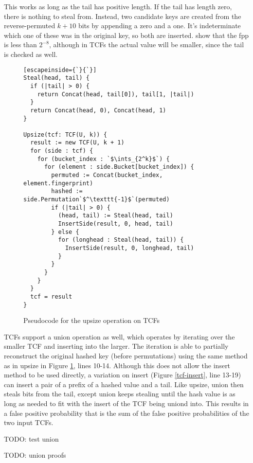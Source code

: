 \documentclass[manuscript,screen,review]{acmart}
\newcommand{\ints}{\mathbb{Z}}
\begin{document}
This works as long as the tail has positive length.
If the tail has length zero, there is nothing to steal from.
Instead, two candidate keys are created from the reverse-permuted $k+10$ bits by appending a zero and a one.
It's indeterminate which one of these was in the original key, so both are inserted.
\cite{psw} show that the fpp is less than $2^{-8}$, although in TCFs the actual value will be smaller, since the tail is checked as well.

\begin{figure}

\begin{lstlisting}[escapeinside={`}{`}]
Steal(head, tail) {
  if (|tail| > 0) {
    return Concat(head, tail[0]), tail[1, |tail|)
  }
  return Concat(head, 0), Concat(head, 1)
}

Upsize(tcf: TCF(U, k)) {
  result := new TCF(U, k + 1)
  for (side : tcf) {
    for (bucket_index : `$\ints_{2^k}$`) {
      for (element : side.Bucket[bucket_index]) {
        permuted := Concat(bucket_index, element.fingerprint)
        hashed := side.Permutation`$^\texttt{-1}$`(permuted)
        if (|tail| > 0) {
          (head, tail) := Steal(head, tail)
          InsertSide(result, 0, head, tail)
        } else {
          for (longhead : Steal(head, tail)) {
            InsertSide(result, 0, longhead, tail)
          }
        }
      }
    }
  }
  tcf = result
}
\end{lstlisting}
\caption{\label{tcf-upsize}
Pseudocode for the upsize operation on TCFs}

\end{figure}

TCFs support a union operation as well, which operates by iterating over the smaller TCF and inserting into the larger.
The iteration is able to partially reconstruct the original hashed key (before permutations) using the same method as in upsize in Figure \ref{tcf-upsize}, lines 10-14.
Although this does not allow the insert method to be used directly, a variation on insert (Figure \ref{tcf-insert}, line 13-19) can insert a pair of a prefix of a hashed value and a tail.
Like upsize, union then steals bits from the tail, except union keeps stealing until the hash value is as long as needed to fit with the insert of the TCF being uniond into.
This results in a false positive probability that is the sum of the false positive probabilities of the two input TCFs.

TODO: test union

TODO: union proofs
\end{document}
